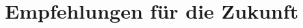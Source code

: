 \label{subsubsec:tech_push_pull}

\section{Empfehlungen für die Zukunft}
\label{sec:empfehlungen}


\label{subsec:wiss_empf}

\label{subsubsec:long_term_studies}

\label{subsubsec:biomarker_research}

\label{subsubsec:transfer_research}

